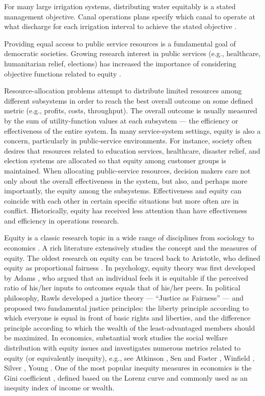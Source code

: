 For many large irrigation systems, distributing water equitably is a stated management objective. Canal operations plans specify which canal to operate at what discharge for each irrigation interval to achieve the stated objective \cite{de2017canal}.

Providing equal access to public service resources is a fundamental goal of democratic societies. Growing research interest in public services (e.g., healthcare, humanitarian relief, elections) has increased the importance of considering objective functions related to equity \cite{yang2013call}.

Resource-allocation problems attempt to distribute limited resources among different subsystems in order to reach the best overall outcome on some defined metric (e.g., profits, costs, throughput). The overall outcome is usually measured by the sum of utility-function values at each subsystem — the efficiency or effectiveness of the entire system. In many service-system settings, equity is also a concern, particularly in public-service environments. For instance, society often desires that resources related to education services, healthcare, disaster relief, and election systems are allocated so that equity among customer groups is maintained. When allocating public-service resources, decision makers care not only about the overall effectiveness in the system, but also, and perhaps more importantly, the equity among the subsystems. Effectiveness and equity can coincide with each other in certain specific situations \cite{butler2002fairness} but more often are in conflict. Historically, equity has received less attention than have effectiveness and efficiency in operations research.

Equity is a classic research topic in a wide range of disciplines from sociology to economics \cite{marsh1994equity}. A rich literature extensively studies the concept and the measures of equity. The oldest research on equity can be traced back to Aristotle, who defined equity as proportional fairness \cite{bertsimas2011price}. In psychology, equity theory was first developed by Adams \cite{adams1965inequity}, who argued that an individual feels it is equitable if the perceived ratio of his/her inputs to outcomes equals that of his/her peers. In political philosophy, Rawls \cite{rawls1971atheory} developed a justice theory — “Justice as Fairness” — and proposed two fundamental justice principles: the liberty principle according to which everyone is equal in front of basic rights and liberties, and the difference principle according to which the wealth of the least-advantaged members should be maximized. In economics, substantial work studies the social welfare distribution with equity issues and investigates numerous metrics related to equity (or equivalently inequity), e.g., see Atkinson \cite{atkinson1970measurement}, Sen and Foster \cite{sen1997economic}, Winfield \cite{winfield2022just}, Silver \cite{silver1989foundations}, Young \cite{young1995equity}. One of the most popular inequity measures in economics is the Gini coefficient \cite{gini1912italian}, defined based on the Lorenz curve and commonly used as an inequity index of income or wealth.

